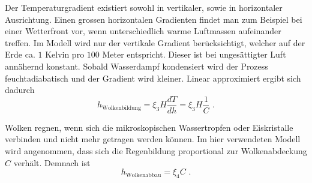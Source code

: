 \begin{refsection}
Der Temperaturgradient existiert sowohl in vertikaler, sowie in horizontaler Ausrichtung. Einen grossen horizontalen Gradienten findet man zum Beispiel bei einer Wetterfront vor, wenn unterschiedlich warme Luftmassen aufeinander treffen. Im Modell wird nur der vertikale Gradient berücksichtigt, welcher auf der Erde ca. $1$ Kelvin pro $100$ Meter entspricht. Dieser ist bei ungesättigter Luft annähernd konstant. Sobald Wasserdampf kondensiert wird der Prozess feuchtadiabatisch und der Gradient wird kleiner. Linear approximiert ergibt sich dadurch
\begin{equation}
h_{\text{Wolkenbildung}} = \xi_3 H \frac{dT}{dh} = \xi_3 H \frac{1}{C} \text{ .}
\end{equation}

Wolken regnen, wenn sich die mikroskopischen Wassertropfen oder Eiskristalle verbinden und nicht mehr getragen werden können. Im hier verwendeten Modell wird angenommen, dass sich die Regenbildung proportional zur Wolkenabdeckung $C$ verhält. Demnach ist
\begin{equation}
h_{\text{Wolkenabbau}} = \xi_4 C \text{ .}
\end{equation}


%



\end{refsection}
